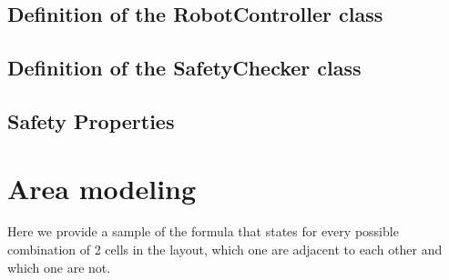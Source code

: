 \documentclass[a4paper]{article}
\begin{document}
\pagebreak
\subsection{Definition of the RobotController class}


\pagebreak
\subsection{Definition of the SafetyChecker class}


\pagebreak
\subsection{Safety Properties}



% 


\pagebreak
\appendix
\section{Area modeling}

Here we provide a sample of the formula that states for every possible combination of 2 cells in the layout, which one are adjacent to each other and which one are not.
\end{document}
